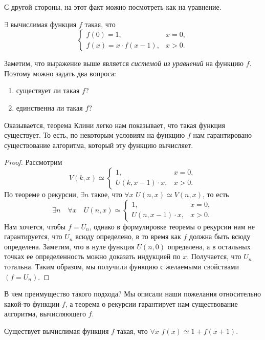 С другой стороны, на этот факт можно посмотреть как на уравнение.
\begin{statement}
    $\exists$ вычислимая функция $f$ такая, что
    $$
        \begin{cases}
            f(0) = 1, & x = 0, \\
            f(x) = x \cdot f(x - 1), & x > 0. 
        \end{cases}
    $$
\end{statement}
Заметим, что выражение выше является {\it системой из уравнений} на функцию $f$.
Поэтому можно задать два вопроса: 
\begin{enumerate}
    \item существует ли такая $f$?
    \item единственна ли такая $f$?
\end{enumerate}
Оказывается, теорема Клини легко нам показывает, что такая функция существует.
То есть, по некоторым условиям на функцию $f$ нам гарантировано существование алгоритма, который эту функцию вычисляет.

\begin{proof}
    Рассмотрим 
    $$
        V\left(k, x\right) \simeq \begin{cases}
            1, & x = 0, \\
            U\left(k, x - 1\right) \cdot x, & x > 0.
        \end{cases}
    $$
    По теореме о рекурсии, $\exists n$ такое, что $\forall x$ $U(n, x) \simeq V(n, x)$, то есть
    $$
        \exists n \quad \forall x \quad U(n, x) \simeq \begin{cases}
            1, & x = 0, \\
            U(n, x - 1) \cdot x, & x > 0.
        \end{cases}
    $$
    Нам хочется, чтобы $f = U_{n}$, однако в формулировке теоремы о рекурсии нам не гарантируется, что $U_{n}$ всюду определено, в то время как $f$ должна быть всюду определена.
    Заметим, что в нуле функция $U(n, 0)$ определена, а в остальных точках ее определенность можно доказать индукцией по $x$.
    Получается, что $U_{n}$ тотальна.
    Таким образом, мы получили функцию с желаемыми свойствами $(f = U_{n})$.
\end{proof}

В чем преимущество такого подхода?
Мы описали наши пожелания относительно какой-то функции $f$, а теорема о рекурсии гарантирует нам существование алгоритма, вычисляющего $f$.

\begin{statement}
    Существует вычислимая функция $f$ такая, что $\forall x$ $f(x) \simeq 1 + f(x + 1)$.
\end{statement}

